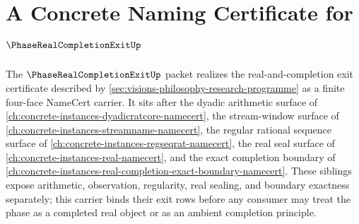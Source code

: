 \chapter{A Concrete Naming Certificate for $\PhaseRealCompletionExitUp$}
\label{ch:concrete-instances-phase-real-completion-exit-namecert}

The $\PhaseRealCompletionExitUp$ packet realizes the real-and-completion exit certificate described by \autoref{sec:visions-philosophy-research-programme} as a finite four-face NameCert carrier. It sits after the dyadic arithmetic surface of \autoref{ch:concrete-instances-dyadicratcore-namecert}, the stream-window surface of \autoref{ch:concrete-instances-streamname-namecert}, the regular rational sequence surface of \autoref{ch:concrete-instances-regseqrat-namecert}, the real seal surface of \autoref{ch:concrete-instances-real-namecert}, and the exact completion boundary of \autoref{ch:concrete-instances-real-completion-exact-boundary-namecert}. These siblings expose arithmetic, observation, regularity, real sealing, and boundary exactness separately; this carrier binds their exit rows before any consumer may treat the phase as a completed real object or as an ambient completion principle.

